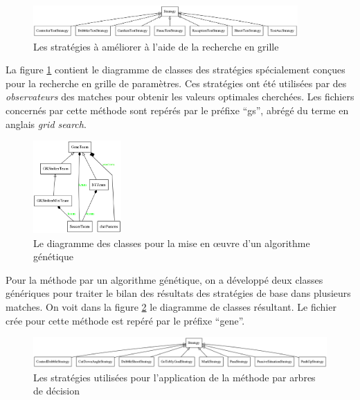 \documentclass[12pt,a4paper]{article}
\begin{document}
\begin{figure}[!h]
  \centering
  \captionsetup{justification=centering}
  \includegraphics[width=0.9\textwidth]{gridSearch}
  \caption[Les strat\'egies pour la recherche en grille]{Les strat\'egies \`a 
am\'eliorer \`a l'aide de la recherche en grille}
  \label{fig:gs}
\end{figure}

La figure \ref{fig:gs} contient le diagramme de classes des strat\'egies 
sp\'ecialement con\c{c}ues pour la recherche en grille de param\`etres. Ces 
strat\'egies ont \'et\'e utilis\'ees par des {\itshape observateurs} des 
matches pour obtenir les valeurs optimales cherch\'ees. Les fichiers 
concern\'es par cette m\'ethode sont rep\'er\'es par le pr\'efixe 
\enquote{gs}, abr\'eg\'e du terme en anglais {\itshape grid search}.

\begin{figure}[!h]
  \centering
  \captionsetup{justification=centering}
  \includegraphics[width=0.3\textwidth]{genetic_mod}
  \caption[Les classes pour l'algorithme g\'en\'etique]{Le diagramme des 
	classes pour la mise en \oe uvre d'un algorithme g\'en\'etique}
  \label{fig:gene}
\end{figure}

Pour la m\'ethode par un algorithme g\'en\'etique, on a d\'evelopp\'e deux 
classes g\'en\'eriques pour traiter le bilan des r\'esultats des strat\'egies 
de base dans plusieurs matches. On voit dans la figure \ref{fig:gene} le 
diagramme de classes r\'esultant. Le fichier cr\'ee pour cette m\'ethode 
est rep\'er\'e par le pr\'efixe \enquote{gene}.

\begin{figure}[!h]
  \centering
  \captionsetup{justification=centering}
  \includegraphics[width=1.\textwidth]{decisionTree}
  \caption[Les strat\'egies pour l'arbre de d\'ecision]{Les strat\'egies 
utilis\'ees pour l'application de la m\'ethode par arbres de d\'ecision}
  \label{fig:dt}
\end{figure}
\end{document}
